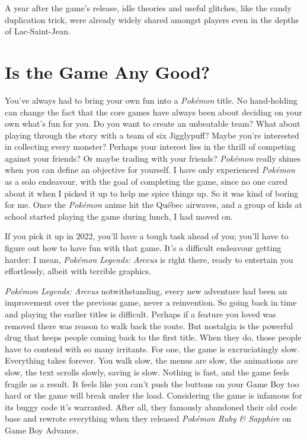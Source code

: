 \documentclass{book}
\begin{document}
A year after the game’s release, idle theories and useful glitches, like the candy duplication trick, were already widely shared amongst players even in the depths of Lac-Saint-Jean.

\FloatBarrier\needspace{10mm}\section*{Is the Game Any Good?}\nopagebreak[4]

You’ve always had to bring your own fun into a \emph{Pokémon} title. No hand-holding can change the fact that the core games have always been about deciding on your own what’s fun for you. Do you want to create an unbeatable team? What about playing through the story with a team of six Jigglypuff? Maybe you’re interested in collecting every monster? Perhaps your interest lies in the thrill of competing against your friends? Or maybe trading with your friends? \emph{Pokémon} really shines when you can define an objective for yourself. I have only experienced \emph{Pokémon} as a solo endeavour, with the goal of completing the game, since no one cared about it when I picked it up to help me spice things up. So it was kind of boring for me. Once the \emph{Pokémon} anime hit the Québec airwaves, and a group of kids at school started playing the game during lunch, I had moved on.

If you pick it up in 2022, you’ll have a tough task ahead of you; you’ll have to figure out how to have fun with that game. It’s a difficult endeavour getting harder: I mean, \emph{Pokémon Legends: Arceus} is right there, ready to entertain you effortlessly, albeit with terrible graphics.

\emph{Pokémon Legends: Arceus} notwithstanding, every new adventure had been an improvement over the previous game, never a reinvention. So going back in time and playing the earlier titles is difficult. Perhaps if a feature you loved was removed there was reason to walk back the route. But nostalgia is the powerful drug that keeps people coming back to the first title. When they do, those people have to contend with so many irritants. For one, the game is excruciatingly slow. Everything takes forever. You walk slow, the menus are slow, the animations are slow, the text scrolls slowly, saving is slow. Nothing is fast, and the game feels fragile as a result. It feels like you can’t push the buttons on your Game Boy too hard or the game will break under the load. Considering the game is infamous for its buggy code it’s warranted. After all, they famously abandoned their old code base and rewrote everything when they released \emph{Pokémon Ruby \& Sapphire} on Game Boy Advance.
\end{document}
